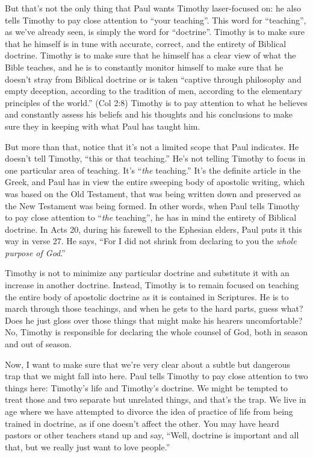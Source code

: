 \documentclass[letterpaper, 12pt]{article}
\begin{document}
    But that's not the only thing that Paul wants Timothy laser-focused
    on: he also tells Timothy to pay close attention to ``your
    teaching''. This word for ``teaching'', as we've already seen, is
    simply the word for ``doctrine''. Timothy is to make sure that he himself is in
    tune with accurate, correct, and the entirety of Biblical doctrine.
    Timothy is to make sure that he himself has a clear view of what the
    Bible teaches, and he is to constantly monitor himself to make sure
    that he doesn't stray from Biblical doctrine or is taken ``captive
    through philosophy and empty deception, according to the tradition
    of men, according to the elementary principles of the world.'' (Col
    2:8) Timothy is to pay attention to what he believes and constantly
    assess his beliefs and his thoughts and his conclusions to make sure
    they in keeping with what Paul has taught him.

    But more than that, notice that it's not a limited scope that Paul
    indicates. He doesn't tell Timothy, ``this or that teaching.'' He's
    not telling Timothy to focus in one particular area of teaching.
    It's ``\emph{the} teaching.'' It's the definite article in the
    Greek, and Paul has in view the entire sweeping body of apostolic
    writing, which was based on the Old Testament, that was being
    written down and preserved as the New Testament was being formed. In
    other words, when Paul tells Timothy to pay close attention to
    ``\emph{the} teaching'', he has in mind the entirety of Biblical
    doctrine. In Acts 20, during his farewell to the Ephesian elders,
    Paul puts it this way in verse 27.  He says, ``For I did not shrink
    from declaring to you the \emph{whole purpose of God}.''

    Timothy is not to minimize any particular doctrine and substitute it
    with an increase in another doctrine. Instead, Timothy is to remain
    focused on teaching the entire body of apostolic doctrine as it is
    contained in Scriptures. He is to march through those teachings, and
    when he gets to the hard parts, guess what? Does he just gloss over
    those things that might make his hearers uncomfortable? No, Timothy
    is responsible for declaring the whole counsel of God, both in
    season and out of season.

    Now, I want to make sure that we're very clear about a subtle but
    dangerous trap that we might fall into here. Paul tells Timothy to
    pay close attention to two things here: Timothy's life and Timothy's
    doctrine. We might be tempted to treat those and two separate but
    unrelated things, and that's the trap. We live in age where we have
    attempted to divorce the idea of practice of life from being trained
    in doctrine, as if one doesn't affect the other. You may have heard
    pastors or other teachers stand up and say, ``Well, doctrine is
    important and all that, but we really just want to love people.'' 
\end{document}

